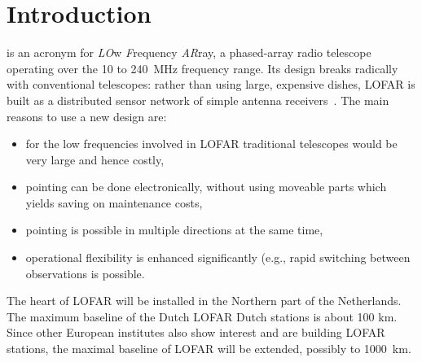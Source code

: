 \documentclass[journal]{IEEEtran}
\begin{document}
\section{Introduction}
% 
% 
% 
% 

 is an acronym for {\em LO\/}w {\em F\/}requency
{\em AR\/}ray, a phased-array radio telescope operating over the 10 to
240~MHz frequency range.
Its design breaks radically with conventional telescopes:
rather than using large, expensive dishes, LOFAR is built as a distributed
sensor network of simple antenna receivers~\cite{Butcher:04}.
The main reasons to use a new design are:

\begin{itemize}
\item for the low frequencies involved in LOFAR traditional telescopes would be very large and hence costly,
\item pointing can be done electronically, without using moveable parts which yields saving on maintenance costs,
\item pointing is possible in multiple directions at the same time,
\item operational flexibility is enhanced significantly (e.g., rapid switching between observations is possible.
\end{itemize}

The heart of LOFAR will be installed in the Northern part of the Netherlands.
The maximum baseline of the Dutch LOFAR Dutch stations is about 100 km.
Since other European institutes also show interest and are building LOFAR
stations, the maximal baseline of LOFAR will be extended, possibly to 1000~km.  
\end{document}
